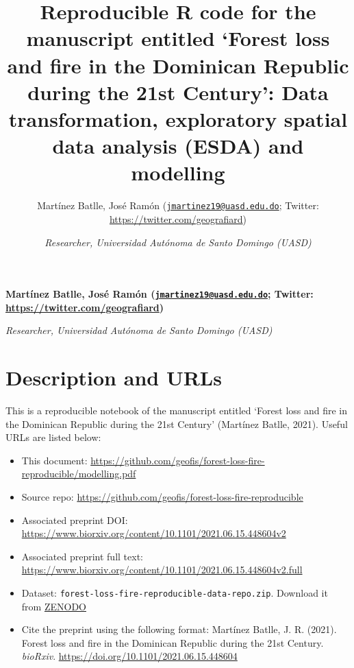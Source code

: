 \documentclass[10pt,landscape,a3paper]{article}
\title{Reproducible R code for the manuscript entitled `Forest loss and
fire in the Dominican Republic during the 21st Century': Data
transformation, exploratory spatial data analysis (ESDA) and
modelling  }
\author{\Large Martínez Batlle, José Ramón
(\href{mailto:jmartinez19@uasd.edu.do}{\nolinkurl{jmartinez19@uasd.edu.do}};
Twitter:
\url{https://twitter.com/geografiard})\vspace{0.05in} \newline\normalsize\emph{}   \and \Large \vspace{0.05in} \newline\normalsize\emph{Researcher,
Universidad Autónoma de Santo Domingo (UASD)}  }
\date{}
\newcommand*{\authorfont}{\fontfamily{phv}\selectfont}
\begin{document}
	
%    


{%
\setlength{\parindent}{0pt}
\thispagestyle{plain}
{\fontsize{18}{20}\selectfont\raggedright 
\maketitle  %

}

{
   \vskip 13.5pt\relax \normalsize\fontsize{11}{12} 
\textbf{\authorfont Martínez Batlle, José Ramón
(\href{mailto:jmartinez19@uasd.edu.do}{\nolinkurl{jmartinez19@uasd.edu.do}};
Twitter:
\url{https://twitter.com/geografiard})} \hskip 15pt \emph{\small }   \par \textbf{\authorfont } \hskip 15pt \emph{\small Researcher,
Universidad Autónoma de Santo Domingo (UASD)}   

}

}






\vskip 6.5pt

{
\hypersetup{linkcolor=black}
\setcounter{tocdepth}{4}
\tableofcontents
}

\noindent  \hypertarget{description-and-urls}{%
\section{Description and URLs}\label{description-and-urls}}

This is a reproducible notebook of the manuscript entitled `Forest loss
and fire in the Dominican Republic during the 21st Century' (Martínez
Batlle, 2021). Useful URLs are listed below:

\begin{itemize}
\item
  This document:
  \url{https://github.com/geofis/forest-loss-fire-reproducible/modelling.pdf}
\item
  Source repo:
  \url{https://github.com/geofis/forest-loss-fire-reproducible}
\item
  Associated preprint DOI:
  \url{https://www.biorxiv.org/content/10.1101/2021.06.15.448604v2}
\item
  Associated preprint full text:
  \url{https://www.biorxiv.org/content/10.1101/2021.06.15.448604v2.full}
\item
  Dataset: \texttt{forest-loss-fire-reproducible-data-repo.zip}.
  Download it from \href{https://zenodo.org/record/5681481}{ZENODO}
\item
  Cite the preprint using the following format: Martínez Batlle, J. R.
  (2021). Forest loss and fire in the Dominican Republic during the 21st
  Century. \emph{bioRxiv}.
  \url{https://doi.org/10.1101/2021.06.15.448604}
\end{itemize}
\end{document}
